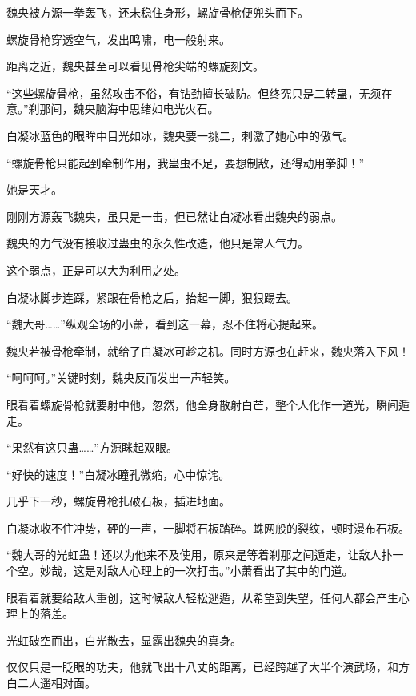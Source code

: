 
\begin{this_body}



魏央被方源一拳轰飞，还未稳住身形，螺旋骨枪便兜头而下。

螺旋骨枪穿透空气，发出鸣啸，电一般射来。

距离之近，魏央甚至可以看见骨枪尖端的螺旋刻文。

“这些螺旋骨枪，虽然攻击不俗，有钻劲擅长破防。但终究只是二转蛊，无须在意。”刹那间，魏央脑海中思绪如电光火石。

白凝冰蓝色的眼眸中目光如冰，魏央要一挑二，刺激了她心中的傲气。

“螺旋骨枪只能起到牵制作用，我蛊虫不足，要想制敌，还得动用拳脚！”

她是天才。

刚刚方源轰飞魏央，虽只是一击，但已然让白凝冰看出魏央的弱点。

魏央的力气没有接收过蛊虫的永久性改造，他只是常人气力。

这个弱点，正是可以大为利用之处。

白凝冰脚步连踩，紧跟在骨枪之后，抬起一脚，狠狠踢去。

“魏大哥……”纵观全场的小萧，看到这一幕，忍不住将心提起来。

魏央若被骨枪牵制，就给了白凝冰可趁之机。同时方源也在赶来，魏央落入下风！

“呵呵呵。”关键时刻，魏央反而发出一声轻笑。

眼看着螺旋骨枪就要射中他，忽然，他全身散射白芒，整个人化作一道光，瞬间遁走。

“果然有这只蛊……”方源眯起双眼。

“好快的速度！”白凝冰瞳孔微缩，心中惊诧。

几乎下一秒，螺旋骨枪扎破石板，插进地面。

白凝冰收不住冲势，砰的一声，一脚将石板踏碎。蛛网般的裂纹，顿时漫布石板。

“魏大哥的光虹蛊！还以为他来不及使用，原来是等着刹那之间遁走，让敌人扑一个空。妙哉，这是对敌人心理上的一次打击。”小萧看出了其中的门道。

眼看着就要给敌人重创，这时候敌人轻松逃遁，从希望到失望，任何人都会产生心理上的落差。

光虹破空而出，白光散去，显露出魏央的真身。

仅仅只是一眨眼的功夫，他就飞出十八丈的距离，已经跨越了大半个演武场，和方白二人遥相对面。


\end{this_body}
